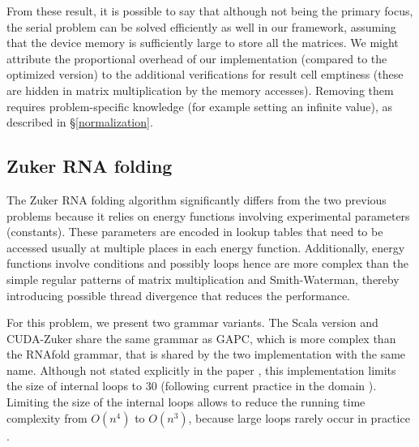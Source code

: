 From these result, it is possible to say that although not being the primary focus, the serial problem can be solved efficiently as well in our framework, assuming that the device memory is sufficiently large to store all the matrices. We might attribute the proportional overhead of our implementation (compared to the optimized version) to the additional verifications for result cell emptiness (these are hidden in matrix multiplication by the memory accesses). Removing them requires problem-specific knowledge (for example setting an infinite value), as described in \S\ref{normalization}.

\subsection{Zuker RNA folding}
The Zuker RNA folding algorithm significantly differs from the two previous problems because it relies on energy functions involving experimental parameters (constants). These parameters are encoded in lookup tables that need to be accessed usually at multiple places in each energy function. Additionally, energy functions involve conditions and possibly loops hence are more complex than the simple regular patterns of matrix multiplication and Smith-Waterman, thereby introducing possible thread divergence that reduces the performance.

For this problem, we present two grammar variants. The Scala version and CUDA-Zuker share the same grammar as GAPC\cite{gapc_thesis}, which is more complex than the RNAfold grammar, that is shared by the two implementation with the same name. Although not stated explicitly in the paper \cite{gpu_rnafold}, this implementation limits the size of internal loops to 30 (following current practice in the domain \cite{rna_structure}). Limiting the size of the internal loops allows to reduce the running time complexity from $O(n^4)$ to $O(n^3)$, because large loops rarely occur in practice \cite{rna_structure}.


